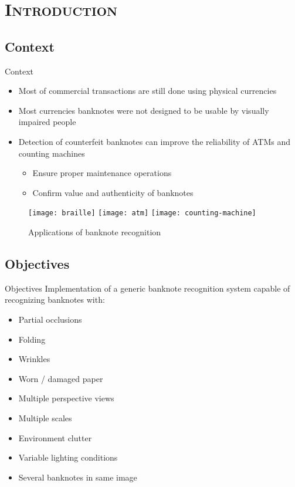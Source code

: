 \section{\scshape Introduction}\label{sec:introduction}

\subsection{Context}
\begin{frame}{Context}
	\begin{itemize}
		\item Most of commercial transactions are still done using physical currencies
		\item Most currencies banknotes were not designed to be usable by visually impaired people
		\item Detection of counterfeit banknotes can improve the reliability of ATMs and counting machines
		\begin{itemize}
			\item Ensure proper maintenance operations
			\item Confirm value and authenticity of banknotes
		\end{itemize}
	\end{itemize}

	\begin{figure}
		\centering
		\texttt{[image: braille]}
		\texttt{[image: atm]}
		\texttt{[image: counting-machine]}
		\caption{Applications of banknote recognition}
		\label{fig:applications}
	\end{figure}
\end{frame}


\subsection{Objectives}
\begin{frame}{Objectives}
	Implementation of a generic banknote recognition system capable of recognizing banknotes with:
	\begin{itemize}
		\item Partial occlusions
		\item Folding
		\item Wrinkles
		\item Worn / damaged paper
		\item Multiple perspective views
		\item Multiple scales
		\item Environment clutter
		\item Variable lighting conditions
		\item Several banknotes in same image
	\end{itemize}
\end{frame}

